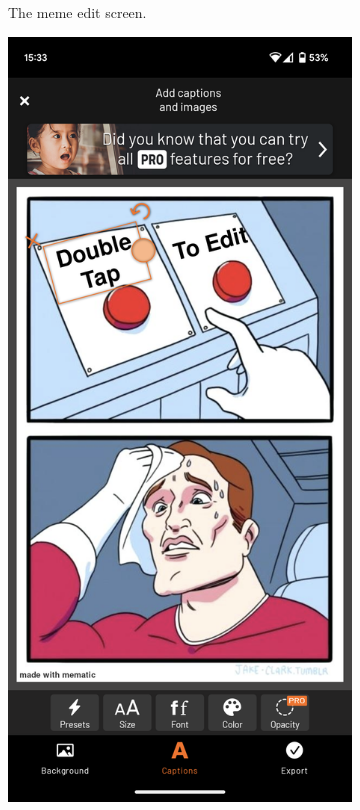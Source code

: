 \begin{figure}
\begin{subfigure}{0.3\textwidth}
        \caption{The meme edit screen.}
        \label{fig:mematic-meme-edit}
    \end{subfigure}
    \begin{subfigure}{0.3\textwidth}
        \centering
        \includegraphics[width=\linewidth]{text/img/mematic/text-edit.png}

\end{subfigure}
\end{figure}

